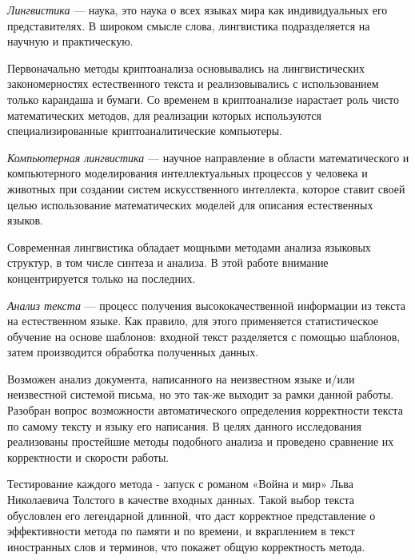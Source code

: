 \DEF\textit{Лингвистика} — наука, это наука о 
всех языках мира как индивидуальных его представителях. В широком смысле 
слова, лингвистика подразделяется на научную и практическую.

Первоначально методы криптоанализа основывались на лингвистических закономерностях 
естественного текста и реализовывались с использованием только карандаша 
и бумаги. Со временем в криптоанализе нарастает роль чисто математических 
методов, для реализации которых используются специализированные криптоаналитические 
компьютеры.

\DEF\textit{Компьютерная лингвистика} — научное направление в области математического 
и компьютерного моделирования интеллектуальных процессов у человека и животных 
при создании систем искусственного интеллекта, которое ставит своей целью 
использование математических моделей для описания естественных языков.

Современная лингвистика обладает мощными методами анализа языковых структур, 
в том числе синтеза и анализа. В этой работе внимание концентрируется только на 
последних.

\DEF\textit{Анализ текста} — процесс получения высококачественной информации из текста 
на естественном языке. Как правило, для этого применяется статистическое 
обучение на основе шаблонов: входной текст разделяется с помощью шаблонов,
затем производится обработка полученных данных.

Возможен анализ документа, написанного на неизвестном языке и/или неизвестной 
системой письма, но это так-же выходит за рамки данной работы. Разобран вопрос 
возможности автоматического определения корректности текста по самому 
тексту и языку его написания. В целях данного исследования реализованы простейшие
методы подобного анализа и проведено сравнение их корректности и скорости работы.

Тестирование каждого метода - запуск с романом «Война и мир» Льва Николаевича 
Толстого в качестве входных данных. Такой выбор текста обусловлен его 
легендарной длинной, что даст корректное представление о эффективности 
метода по памяти и по времени, и вкраплением в текст иностранных слов 
и терминов, что покажет общую корректность метода.

